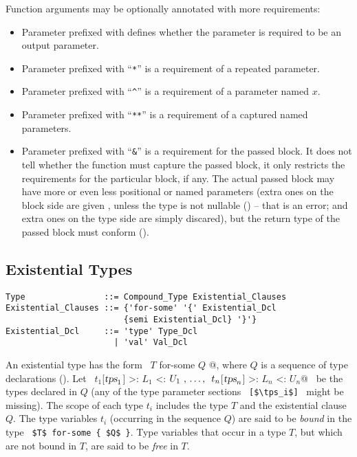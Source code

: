 Function arguments may be optionally annotated with more requirements: 
\begin{itemize}
\item
Parameter prefixed with  defines whether the parameter is required to be an output parameter. 

\item
Parameter prefixed with ``\lstinline!*!'' is a requirement of a repeated parameter. 

\item 
Parameter prefixed with ``\lstinline!^!'' is a requirement of a parameter named $x$.

\item 
Parameter prefixed with ``\lstinline!**!'' is a requirement of a captured named parameters. 

\item
Parameter prefixed with ``\lstinline!&!'' is a requirement for the passed block. It does not tell whether the function must capture the passed block, it only restricts the requirements for the particular block, if any. The actual passed block may have more or even less positional or named parameters (extra ones on the block side are given , unless the type is not nullable () -- that is an error; and extra ones on the type side are simply discared), but the return type of the passed block must conform ().
\end{itemize}






\subsection{Existential Types}
\label{sec:existential-types}

\syntax\begin{lstlisting}[escapechar=@]
Type                ::= Compound_Type Existential_Clauses
Existential_Clauses ::= {'for-some' '{' Existential_Dcl
                        {semi Existential_Dcl} '}'}
Existential_Dcl     ::= 'type' Type_Dcl
                      | 'val' Val_Dcl
\end{lstlisting}

An existential type has the form ~\lstinline@$T$ for-some { $Q$ }@, where $Q$ is a sequence of type declarations (). Let ~\lstinline@$t_1$[$\mbox{\sl tps}_1$] >: $L_1$ <: $U_1\ ,\, \ldots ,\,\ t_n$[$\mbox{\sl tps}_n$] >: $L_n$ <: $U_n$@~ be the types declared in $Q$ (any of the type parameter sections ~\lstinline![$\tps_i$]!~ might be missing). The scope of each type $t_i$ includes the type $T$ and the existential clause $Q$. The type variables $t_i$ (occurring in the sequence $Q$) are said to be {\em bound} in the type ~\lstinline!$T$ for-some { $Q$ }!. Type variables that occur in a type $T$, but which are not bound in $T$, are said to be {\em free} in $T$. 

